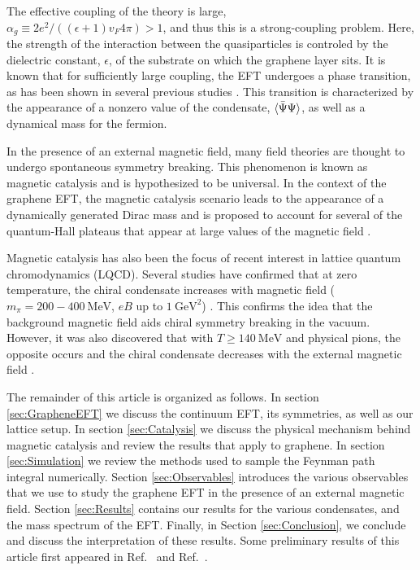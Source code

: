 \documentclass[aps,prd,twocolumn,showpacs,superscriptaddress,groupedaddress]{revtex4}  %
\begin{document}
The effective coupling of the theory is large, \\ $\alpha_g \equiv 2e^2/((\epsilon+1) v_F 4\pi) > 1$, and thus this is a strong-coupling problem. Here, the strength of the interaction between the quasiparticles is controled by the dielectric constant, $\epsilon$, of the substrate on which the graphene layer sits. It is known that for sufficiently large coupling, the EFT undergoes a phase transition, as has been shown in 
several previous studies \cite{Drut1, Drut2, Hands1, Hands2}. This transition is characterized by the appearance of a nonzero value of the condensate, ${\langle {\bar \Psi} \Psi \rangle}$, as well as a dynamical mass
for the fermion.

In the presence of an external magnetic field, many field theories are thought to undergo spontaneous symmetry breaking. This phenomenon is known as magnetic catalysis and is hypothesized to be universal. In the context of the graphene EFT, the magnetic
catalysis scenario leads to the appearance of a dynamically generated Dirac mass and is proposed to account for several of the quantum-Hall plateaus that appear at large values of the magnetic field \cite{ZhangQHE,JiangQHE, Kennett}.

Magnetic catalysis has also been the focus of recent interest in lattice quantum chromodynamics (LQCD). Several studies have confirmed that at zero temperature, the chiral condensate
increases with magnetic field ($m_{\pi} = 200-400 ~\text{MeV}$, $eB$ up to $1 ~\text{GeV}^2$) \cite{Buividovich,Braguta,Cohen}. This confirms the idea that the background magnetic field aids chiral symmetry breaking in the vacuum.
However, it was also discovered that with $T \geq 140 ~\text{MeV}$ and physical pions, the opposite occurs and the chiral condensate decreases with the external magnetic field \cite{Bali1,Bali2}.

The remainder of this article is organized as follows. In section \ref{sec:GrapheneEFT} we discuss the continuum EFT, its symmetries, as well as our lattice setup.
In section \ref{sec:Catalysis} we discuss the physical mechanism behind magnetic catalysis and review the results that apply to graphene. In section \ref{sec:Simulation} we review the methods used to sample the Feynman path integral numerically. Section \ref{sec:Observables} introduces the various observables that we use to study the graphene EFT in the presence of an external magnetic field. Section \ref{sec:Results} contains our results for the various condensates, and the mass spectrum of the EFT.
Finally, in Section \ref{sec:Conclusion}, we conclude and discuss the interpretation of these results. Some preliminary results of this article first appeared in Ref.~\cite{DPF2015} and Ref.~\cite{GrapheneLetter}.
\end{document}
